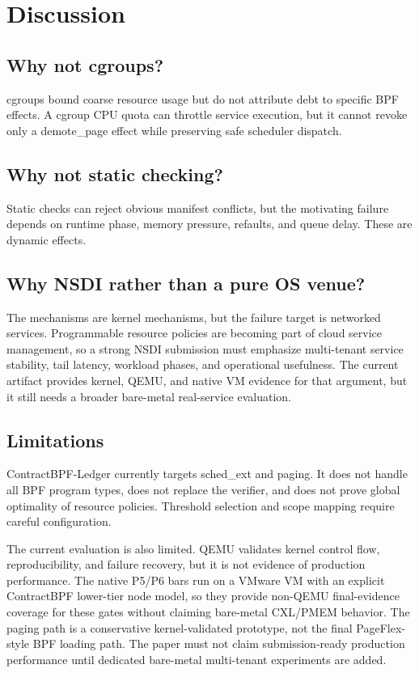 \documentclass[letterpaper,twocolumn,10pt]{article}
\newcommand{\sys}{ContractBPF-Ledger\xspace}
\begin{document}
\section{Discussion}

\subsection{Why not cgroups?}

cgroups bound coarse resource usage but do not attribute debt to specific BPF effects. A cgroup CPU quota can throttle service execution, but it cannot revoke only a demote\_page effect while preserving safe scheduler dispatch.

\subsection{Why not static checking?}

Static checks can reject obvious manifest conflicts, but the motivating failure depends on runtime phase, memory pressure, refaults, and queue delay. These are dynamic effects.

\subsection{Why NSDI rather than a pure OS venue?}

The mechanisms are kernel mechanisms, but the failure target is networked services. Programmable resource policies are becoming part of cloud service management, so a strong NSDI submission must emphasize multi-tenant service stability, tail latency, workload phases, and operational usefulness. The current artifact provides kernel, QEMU, and native VM evidence for that argument, but it still needs a broader bare-metal real-service evaluation.

\subsection{Limitations}

\sys currently targets sched\_ext and paging. It does not handle all BPF program types, does not replace the verifier, and does not prove global optimality of resource policies. Threshold selection and scope mapping require careful configuration.

The current evaluation is also limited. QEMU validates kernel control flow,
reproducibility, and failure recovery, but it is not evidence of production
performance. The native P5/P6 bars run on a VMware VM with an explicit
ContractBPF lower-tier node model, so they provide non-QEMU final-evidence
coverage for these gates without claiming bare-metal CXL/PMEM behavior. The
paging path is a conservative kernel-validated prototype, not the final
PageFlex-style BPF loading path. The paper must not claim submission-ready
production performance until dedicated bare-metal multi-tenant experiments are
added.
\end{document}
